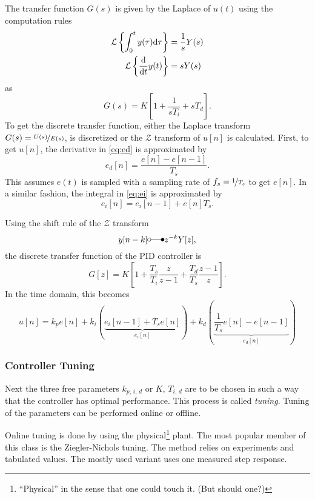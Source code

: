 The transfer function $G(s)$ is given by the Laplace of $u(t)$ using the computation rules\cite{Leon2015}
\begin{align}
\mathcal{L}\left\{\int_{0}^{t} y(\tau) \text{d}{\tau}\right\} &= \frac{1}{s} Y(s)\\
\mathcal{L}\left\{\frac{\text{d}{}}{\text{d}{t}} y(t)\right\} &= s Y(s)
\end{align}
as
\begin{equation}
G(s)=K\left[1+\frac{1}{s T_i}+s T_d\right].
\end{equation}
To get the discrete transfer function, either the Laplace transform $G(s)=\nicefrac{U(s)}{E(s)}$, is discretized or the $\mathcal{Z}$ transform of $u[n]$ is calculated.
First, to get $u[n]$, the derivative in \autoref{eq:ed} is approximated by
\begin{equation}
e_d[n]=\frac{e[n]-e[n-1]}{T_s}.
\end{equation}
This assumes $e(t)$ is sampled with a sampling rate of $f_s=\nicefrac{1}{T_s}$ to get $e[n]$. In a similar fashion, the integral in \autoref{eq:ei} is approximated by
\begin{equation}
e_i[n]=e_i[n-1] + e[n] T_s.
\end{equation}

Using the shift rule of the $\mathcal{Z}$ transform\cite{Leon2015}
\begin{equation}
y[n-k] \laplace z^{-k} Y[z],
\end{equation}
the discrete transfer function of the PID controller is
\begin{equation}
G[z]=K\left[1+\frac{T_s}{T_i}\frac{z}{z-1}+\frac{T_d}{T_s}\frac{z-1}{z}\right].
\end{equation}
In the time domain, this becomes
\begin{equation}\label{eq:pidn}
u[n] = k_p e[n] 
+ k_i \left(\underbrace{e_i[n-1] + T_s e[n]}_{e_i[n]}\right) 
+ k_d \left(\underbrace{\frac{1}{T_s} e[n]-e[n-1]}_{e_d[n]}\right)
\end{equation}

\subsubsection{Controller Tuning}
Next the three free parameters $k_{p,\,i,\,d}$ or $K,\,T_{i,\,d}$ are to be chosen in such a way that the controller has optimal performance. This process is called \textit{tuning}. Tuning of the parameters can be performed online or offline.

Online tuning is done by using the physical\footnote{``Physical'' in the sense that one could touch it. (But should one?)} plant. The most popular member of this class is the Ziegler-Nichols tuning\cite{Ziegler1942}. The method relies on experiments and tabulated values. The mostly used variant uses one measured step response.

